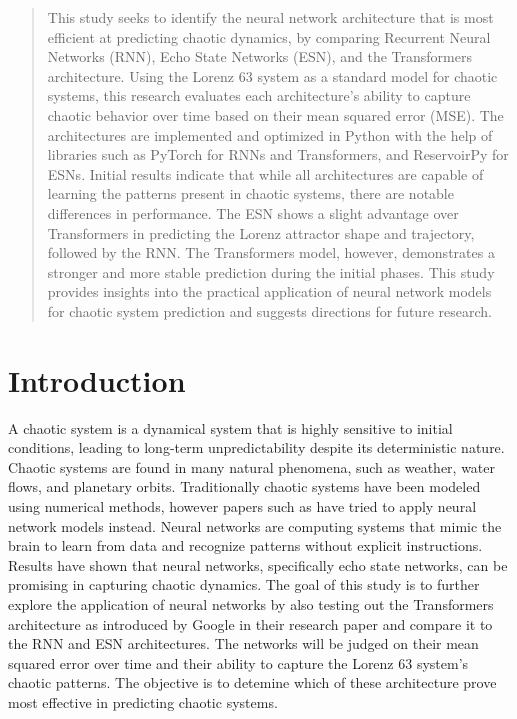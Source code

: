 \documentclass[11pt]{article}
\title{}
\author{Sebastian M.D.}
\date{March 2024}
\begin{document}
\maketitle
\thispagestyle{empty} %

\newpage
\null{}
\begin{abstract}
    \noindent This study seeks to identify the neural network architecture that is most efficient at predicting chaotic dynamics, by comparing Recurrent Neural Networks (RNN), Echo State Networks (ESN), and the Transformers architecture. Using the Lorenz 63 system as a standard model for chaotic systems, this research evaluates each architecture's ability to capture chaotic behavior over time based on their mean squared error (MSE). The architectures are implemented and optimized in Python with the help of libraries such as PyTorch for RNNs and Transformers, and ReservoirPy for ESNs. Initial results indicate that while all architectures are capable of learning the patterns present in chaotic systems, there are notable differences in performance. The ESN shows a slight advantage over Transformers in predicting the Lorenz attractor shape and trajectory, followed by the RNN. The Transformers model, however, demonstrates a stronger and more stable prediction during the initial phases. This study provides insights into the practical application of neural network models for chaotic system prediction and suggests directions for future research.
\end{abstract}
\newpage


\tableofcontents
\newpage

\section{Introduction}
A chaotic system is a dynamical system that is highly sensitive to initial conditions, leading to long-term unpredictability despite its deterministic nature. Chaotic systems are found in many natural phenomena, such as weather, water flows, and planetary orbits. Traditionally chaotic systems have been modeled using numerical methods, however papers such as \cite{npg-27-373-2020} have tried to apply neural network models instead. Neural networks are computing systems that mimic the brain to learn from data and recognize patterns without explicit instructions. Results have shown that neural networks, specifically echo state networks, can be promising in capturing chaotic dynamics. The goal of this study is to further explore the application of neural networks by also testing out the Transformers architecture as introduced by Google in their research paper \cite{DBLP:journals/corr/VaswaniSPUJGKP17} and compare it to the RNN and ESN architectures. The networks will be judged on their mean squared error over time and their ability to capture the Lorenz 63 system's chaotic patterns. The objective is to detemine which of these architecture prove most effective in predicting chaotic systems.
\end{document}
